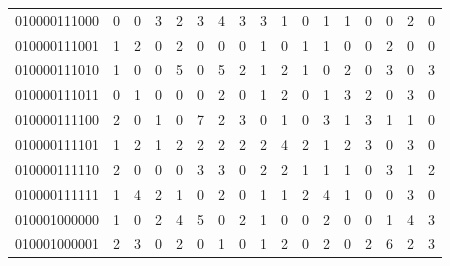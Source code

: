 \documentclass[10pt,a4paper]{article}
\begin{document}
\begin{longtable}{ |c|c|c|c|c|c|c|c|c|c|c|c|c|c|c|c|c| }
    010000111000              & 0                            & 0                                & 3                            & 2                              & 3   & 4   & 3   & 3   & 1   & 0   & 1   & 1   & 0   & 0   & 2   & 0   \\
    010000111001              & 1                            & 2                                & 0                            & 2                              & 0   & 0   & 0   & 1   & 0   & 1   & 1   & 0   & 0   & 2   & 0   & 0   \\
    010000111010              & 1                            & 0                                & 0                            & 5                              & 0   & 5   & 2   & 1   & 2   & 1   & 0   & 2   & 0   & 3   & 0   & 3   \\
    010000111011              & 0                            & 1                                & 0                            & 0                              & 0   & 2   & 0   & 1   & 2   & 0   & 1   & 3   & 2   & 0   & 3   & 0   \\
    010000111100              & 2                            & 0                                & 1                            & 0                              & 7   & 2   & 3   & 0   & 1   & 0   & 3   & 1   & 3   & 1   & 1   & 0   \\
    010000111101              & 1                            & 2                                & 1                            & 2                              & 2   & 2   & 2   & 2   & 4   & 2   & 1   & 2   & 3   & 0   & 3   & 0   \\
    010000111110              & 2                            & 0                                & 0                            & 0                              & 3   & 3   & 0   & 2   & 2   & 1   & 1   & 1   & 0   & 3   & 1   & 2   \\
    010000111111              & 1                            & 4                                & 2                            & 1                              & 0   & 2   & 0   & 1   & 1   & 2   & 4   & 1   & 0   & 0   & 3   & 0   \\
    010001000000              & 1                            & 0                                & 2                            & 4                              & 5   & 0   & 2   & 1   & 0   & 0   & 2   & 0   & 0   & 1   & 4   & 3   \\
    010001000001              & 2                            & 3                                & 0                            & 2                              & 0   & 1   & 0   & 1   & 2   & 0   & 2   & 0   & 2   & 6   & 2   & 3   \\

\end{longtable}
\end{document}

